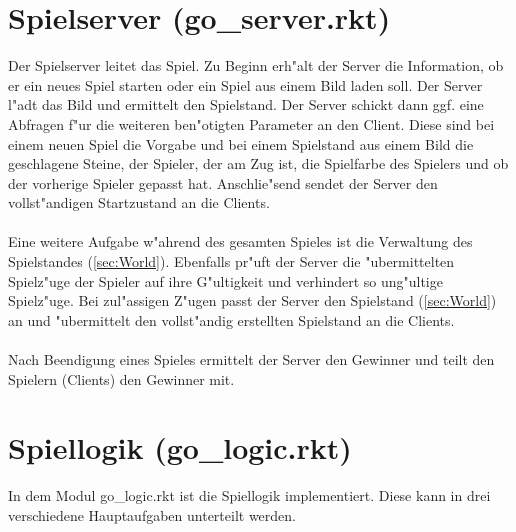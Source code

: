 \documentclass[a4paper]{scrreprt}
\begin{document}
\section{Spielserver (go\_server.rkt)}
Der Spielserver leitet das Spiel. Zu Beginn erh"alt der Server die Information, ob er ein neues Spiel starten oder ein Spiel aus einem Bild laden soll. Der Server l"adt das Bild und ermittelt den Spielstand. Der Server schickt dann ggf. eine Abfragen f"ur die weiteren ben"otigten Parameter an den Client. Diese sind bei einem neuen Spiel die Vorgabe und bei einem Spielstand aus einem Bild die geschlagene Steine, der Spieler, der am Zug ist, die Spielfarbe des Spielers und ob der vorherige Spieler gepasst hat. Anschlie"send sendet der Server den vollst"andigen Startzustand an die Clients.\\\\
Eine weitere Aufgabe w"ahrend des gesamten Spieles ist die Verwaltung des Spielstandes (\ref{sec:World}). Ebenfalls pr"uft der Server die "ubermittelten Spielz"uge der Spieler auf ihre G"ultigkeit und verhindert so ung"ultige Spielz"uge. Bei zul"assigen Z"ugen passt der Server den Spielstand (\ref{sec:World}) an und "ubermittelt den vollst"andig erstellten Spielstand an die Clients.\\\\ 
Nach Beendigung eines Spieles ermittelt der Server den Gewinner und teilt den Spielern (Clients) den Gewinner mit.

\section{Spiellogik (go\_logic.rkt)}
In dem Modul go\_logic.rkt ist die Spiellogik implementiert. Diese kann in drei verschiedene Hauptaufgaben unterteilt werden.
\end{document}
